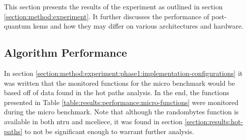 This section presents the results of the experiment as outlined in section \ref{section:method:experiment}. It further discusses the performance of \gls{post-quantum} \glspl{kem} and how they may differ on various architectures and hardware.

\subsection{Algorithm Performance}

In section \ref{section:method:experiment:phase1:implementation-configurations} it was written that the monitored functions for the micro benchmark would be based off of data found in the hot paths analysis. In the end, the functions presented in Table \ref{table:results:performance:micro-functions} were monitored during the micro benchmark. Note that although the randombytes function is available in both \gls{ntru} and \gls{mceliece}, it was found in section \ref{section:results:hot-paths} to not be significant enough to warrant further analysis.

